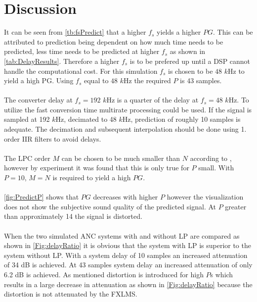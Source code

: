 \section{Discussion}
It can be seen from \autoref{tb:fsPredict} that a higher $f_s$ yields a higher $PG$. This can be attributed to prediction being dependent on how much time needs to be predicted, less time needs to be predicted at higher $f_s$ as shown in \autoref{tab:DelayResults}.  
Therefore a higher $f_s$ is to be prefered up until a DSP cannot handle the computational cost. For this simulation $f_s$ is chosen to be $48$ $k$Hz to yield a high PG. 
Using $f_s$ equal to $48$ $k$Hz the required $P$ is 43 samples.  
\\\\
The converter delay at $f_s=192$ $k$Hz is a quarter of the delay at $f_s=48$ $k$Hz. To utilize the fast conversion time multirate processing could be used. If the signal is sampled at 192 $k$Hz, decimated to 48 $k$Hz, prediction of roughly 10 samples is adequate. The decimation and subsequent interpolation should be done using 1. order IIR filters to avoid delays.  
\\\\
The LPC order $M$ can be chosen to be much smaller than $N$ according to \cite{Speech}, however by experiment it was found that this is only true for $P$ small. With $P=10$, $M=N$ is required to yield a high $PG$. 
\\\\
\autoref{fig:PredictP} shows that $PG$ decreases with higher $P$ however the visualization does not show the subjective sound quality of the predicted signal. At $P$ greater than approximately 14 the signal is distorted.    
\\\\
When the two simulated ANC systems with and without LP are compared as shown in \autoref{Fig:delayRatio} it is obvious that the system with LP is superior to the system without LP. With a system delay of 10 samples an increased attenuation of 34 dB is achieved. At 43 samples system delay an increased attenuation of only 6.2 dB is achieved. As mentioned distortion is introduced for high $P$s which results in a large decrease in attenuation as shown in \autoref{Fig:delayRatio} because the distortion is not attenuated by the FXLMS.
